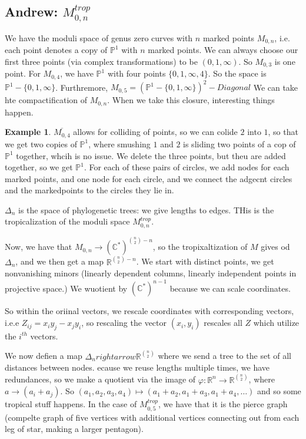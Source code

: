\documentclass[12pt]{memoir}
\theoremstyle{definition}
\newtheorem{protoexample}{Example}[section]
\newenvironment{ex}
   {\begin{protoexample}}
   {\end{protoexample}}
\def\RR{{\mathbb R}}
\def\CC{{\mathbb C}}
\def\PP{{\mathbb P}}
\begin{document}
\subsection{Andrew: $M_{0,n}^{trop}$}


We have the moduli space of genus zero curves with $n$ marked points $M_{0,n}$, i.e. each point denotes a copy of $\PP^1$ with $n$ marked points. We can always choose our first three points (via complex transformations) to be $(0,1, \infty)$. So $M_{0,3}$ is one point. For $M_{0,4}$, we have $\PP^1$ with four points $\{0,1, \infty, 4\}$. So the space is $\PP^1-\{0,1, \infty\}$. Furthremore, $M_{0,5} = (\PP^1 - \{0,1, \infty\})^2-Diagonal$ We can take hte compactification of $M_{0,n}$. When we take this closure, interesting things happen.

\begin{ex}
    $\overline{M_{0,4}}$ allows for colliding of points, so we can colide $2$ into $1$, so that we get two copies of $\PP^1$, where smushing $1$ and $2$ is sliding two points of a cop of $\PP^1$ together, whcih is no issue. We delete the three points, but theu are added together, so we get $\PP^1$. For each of these pairs of circles, we add nodes for each marked points, and one node for each circle, and we connect the adgecnt circles and the markedpoints to the circles they lie in.
\end{ex}

$\Delta_n$ is the space of phylogenetic trees: we give lengths to edges. THis is the tropicalization of the moduli space $M_{0,n}^{trop}$.

Now, we have that $M_{0,n}\rightarrow (\CC^*)^{\binom{n}{2}-n}$, so the tropixaltization of $M$ gives od $\Delta_n$, and we then get a map $\RR^{\binom{n}{2}-n}$. We start with distinct points, we get nonvanishing minors (linearly dependent columns, linearly independent points in projective space.) We wuotient by $(\CC^*)^{n-1}$ because we can scale coordinates.


So within the oriinal vectors, we rescale coordinates with corresponding vectors, i.e.e $Z_{ij}=x_iy_j-x_jy_i$, so rescaling the vector $(x_i,y_i)$ rescales all $Z$ which utilize the $i^{th}$ vectors.

We now defien a map $\Delta_nrightarrow \RR^{\binom{n}{2}}$ where we send a tree to the set of all distances between nodes. ecause we reuse lengths multiple times, we have redundances, so we make a quotient via the image of $\varphi:\RR^n \rightarrow \RR^{\binom{n}{2}}$, where $a \rightarrow (a_i+a_j)$. So $(a_1,a_2, a_3,a_4) \mapsto (a_1+a_2,a_1+a_3,a_1+a_4, \dots)$ and so some tropical stuff happens. In the case of $M_{0,5}^{trop}$, we have that it is the pierce graph (compelte graph of five vertices with additional vertices connecting out from each leg of star, making a larger pentagon).
\end{document}
